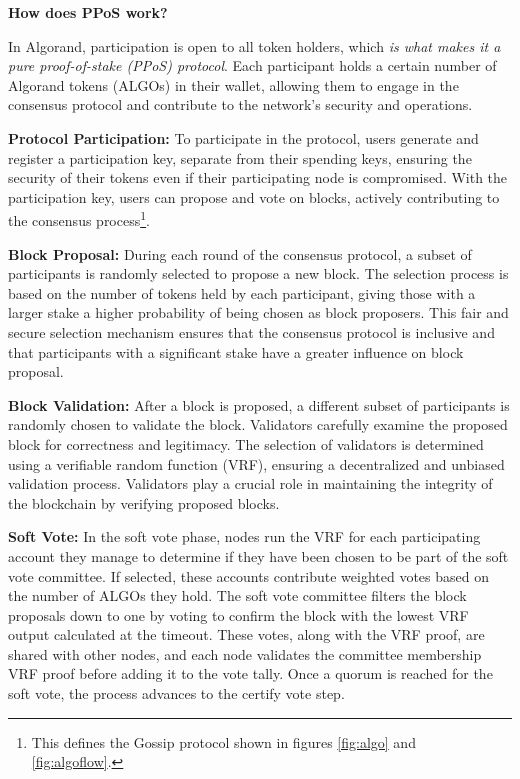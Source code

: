 \textbf{How does PPoS work?} \cite{alg, algo, ppow}\newline

In Algorand, participation is open to all token holders, which \textit{is what makes it a pure proof-of-stake (PPoS) protocol}. Each participant holds a certain number of Algorand tokens (ALGOs) in their wallet, allowing them to engage in the consensus protocol and contribute to the network's security and operations.\newline

\textbf{Protocol Participation:}
To participate in the protocol, users generate and register a participation key, separate from their spending keys, ensuring the security of their tokens even if their participating node is compromised. With the participation key, users can propose and vote on blocks, actively contributing to the consensus process\footnote{This defines the Gossip protocol shown in figures \ref{fig:algo} and \ref{fig:algoflow}.}.\newline

\textbf{Block Proposal:}
During each round of the consensus protocol, a subset of participants is randomly selected to propose a new block. The selection process is based on the number of tokens held by each participant, giving those with a larger stake a higher probability of being chosen as block proposers. This fair and secure selection mechanism ensures that the consensus protocol is inclusive and that participants with a significant stake have a greater influence on block proposal.\newline

\textbf{Block Validation:}
After a block is proposed, a different subset of participants is randomly chosen to validate the block. Validators carefully examine the proposed block for correctness and legitimacy. The selection of validators is determined using a verifiable random function (VRF), ensuring a decentralized and unbiased validation process. Validators play a crucial role in maintaining the integrity of the blockchain by verifying proposed blocks.\newline

\textbf{Soft Vote:}
In the soft vote phase, nodes run the VRF for each participating account they manage to determine if they have been chosen to be part of the soft vote committee. If selected, these accounts contribute weighted votes based on the number of ALGOs they hold. The soft vote committee filters the block proposals down to one by voting to confirm the block with the lowest VRF output calculated at the timeout. These votes, along with the VRF proof, are shared with other nodes, and each node validates the committee membership VRF proof before adding it to the vote tally. Once a quorum is reached for the soft vote, the process advances to the certify vote step.\newline

